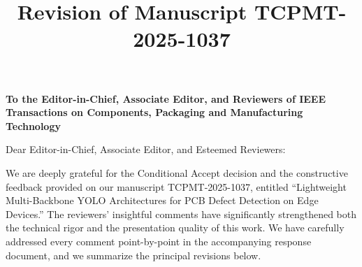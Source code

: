 \documentclass[conference]{IEEEtran}
\begin{document}
\title{Revision of Manuscript TCPMT-2025-1037}

\author{
}

\maketitle

\begin{center}
\textbf{To the Editor-in-Chief, Associate Editor, and Reviewers of IEEE Transactions on Components, Packaging and Manufacturing Technology}
\end{center}

\vspace{1em}

Dear Editor-in-Chief, Associate Editor, and Esteemed Reviewers:

We are deeply grateful for the Conditional Accept decision and the constructive feedback provided on our manuscript TCPMT-2025-1037, entitled ``Lightweight Multi-Backbone YOLO Architectures for PCB Defect Detection on Edge Devices.'' The reviewers' insightful comments have significantly strengthened both the technical rigor and the presentation quality of this work. We have carefully addressed every comment point-by-point in the accompanying response document, and we summarize the principal revisions below.
\end{document}
